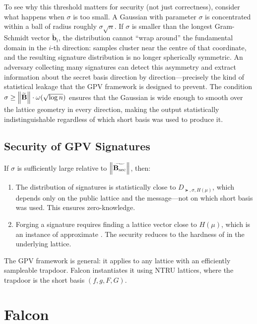To see why this threshold matters for security (not just correctness), consider what happens when $\sigma$ is too small.  A Gaussian with parameter $\sigma$ is concentrated within a ball of radius roughly $\sigma\sqrt{n}$.  If $\sigma$ is smaller than the longest Gram-Schmidt vector $\widetilde{\mathbf{b}}_i$, the distribution cannot ``wrap around'' the fundamental domain in the $i$-th direction: samples cluster near the centre of that coordinate, and the resulting signature distribution is no longer spherically symmetric.  An adversary collecting many signatures can detect this asymmetry and extract information about the secret basis direction by direction---precisely the kind of statistical leakage that the GPV framework is designed to prevent.  The condition $\sigma \geq \left\lVert \widetilde{\mathbf{B}} \right\rVert \cdot \omega(\sqrt{\log n})$ ensures that the Gaussian is wide enough to smooth over the lattice geometry in every direction, making the output statistically indistinguishable regardless of which short basis was used to produce it.

\subsection{Security of GPV Signatures}
\label{subsec:gpv-security}

\begin{theorem}
\label{thm:gpv-security}
If $\sigma$ is sufficiently large relative to $\left\lVert \widetilde{\mathbf{B}_{\mathrm{sec}}} \right\rVert$, then:
\begin{enumerate}
\item The distribution of signatures is statistically close to $D_{\lat, \sigma, H(\mu)}$, which depends only on the public lattice and the message---not on which short basis was used.  This ensures zero-knowledge.
\item Forging a signature requires finding a lattice vector close to $H(\mu)$, which is an instance of approximate \cvp{}.  The security reduces to the hardness of \sivp{} in the underlying lattice.
\end{enumerate}
\end{theorem}

The GPV framework is general: it applies to any lattice with an efficiently sampleable trapdoor.  Falcon instantiates it using NTRU lattices, where the trapdoor is the short basis $(f, g, F, G)$.


\section{Falcon}
\label{sec:falcon}

